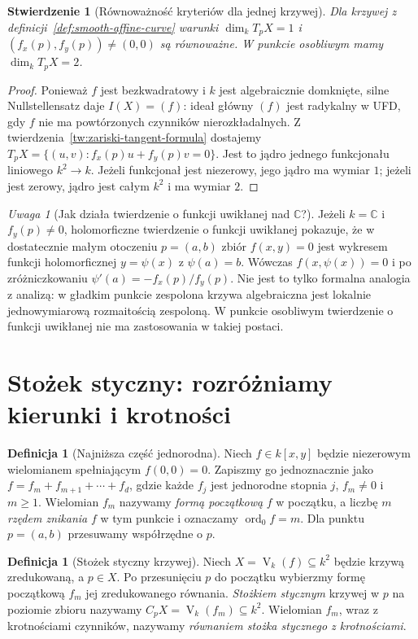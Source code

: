 \documentclass[11pt,a4paper,openany]{report}
\numberwithin{equation}{section}
\theoremstyle{plain}
\newtheorem{stwierdzenie}[twierdzenie]{Stwierdzenie}
\theoremstyle{definition}
\newtheorem{definicja}[twierdzenie]{Definicja}
\theoremstyle{remark}
\newtheorem{uwaga}[twierdzenie]{Uwaga}
\newcommand{\C}{\mathbb C}
\newcommand{\V}{\operatorname V}
\begin{document}
\begin{stwierdzenie}[Równoważność kryteriów dla jednej krzywej]
Dla krzywej z definicji~\ref{def:smooth-affine-curve}
warunki $\dim_k T_pX=1$ i
$(f_x(p),f_y(p))\ne(0,0)$ są równoważne.
W punkcie osobliwym mamy $\dim_kT_pX=2$.
\end{stwierdzenie}
\begin{proof}
Ponieważ $f$ jest bezkwadratowy i $k$ jest algebraicznie
domknięte, silne Nullstellensatz daje $I(X)=(f)$:
ideał główny $(f)$ jest radykalny w UFD, gdy $f$ nie ma
powtórzonych czynników nierozkładalnych.
Z twierdzenia~\ref{tw:zariski-tangent-formula} dostajemy
$T_pX=\{(u,v):f_x(p)u+f_y(p)v=0\}$.
Jest to jądro jednego funkcjonału liniowego $k^2\to k$.
Jeżeli funkcjonał jest niezerowy, jego jądro ma wymiar $1$;
jeżeli jest zerowy, jądro jest całym $k^2$ i ma wymiar $2$.
\end{proof}

\begin{uwaga}[Jak działa twierdzenie o funkcji uwikłanej nad $\C$?]
Jeżeli $k=\C$ i $f_y(p)\ne0$, holomorficzne twierdzenie
o funkcji uwikłanej pokazuje, że w dostatecznie małym
otoczeniu $p=(a,b)$ zbiór $f(x,y)=0$ jest wykresem
funkcji holomorficznej $y=\psi(x)$ z $\psi(a)=b$.
Wówczas $f(x,\psi(x))=0$ i po zróżniczkowaniu
$\psi'(a)=-f_x(p)/f_y(p)$. Nie jest to tylko formalna
analogia z analizą: w gładkim punkcie zespolona krzywa
algebraiczna jest lokalnie jednowymiarową rozmaitością
zespoloną. W punkcie osobliwym twierdzenie o funkcji
uwikłanej nie ma zastosowania w takiej postaci.
\end{uwaga}

\section{Stożek styczny: rozróżniamy kierunki i krotności}

\begin{definicja}[Najniższa część jednorodna]
Niech $f\in k[x,y]$ będzie niezerowym wielomianem
spełniającym $f(0,0)=0$. Zapiszmy go jednoznacznie jako
$f=f_m+f_{m+1}+\cdots+f_d$, gdzie każde $f_j$
jest jednorodne stopnia $j$, $f_m\ne0$ i $m\ge1$.
Wielomian $f_m$ nazywamy \emph{formą początkową} $f$
w początku, a liczbę $m$ \emph{rzędem znikania} $f$
w tym punkcie i oznaczamy $\operatorname{ord}_0f=m$.
Dla punktu $p=(a,b)$ przesuwamy współrzędne o $p$.
\end{definicja}

\begin{definicja}[Stożek styczny krzywej]
Niech $X=\V_k(f)\subseteq k^2$ będzie krzywą zredukowaną,
a $p\in X$. Po przesunięciu $p$ do początku wybierzmy
formę początkową $f_m$ jej zredukowanego równania.
\emph{Stożkiem stycznym} krzywej w $p$ na poziomie zbioru
nazywamy $C_pX=\V_k(f_m)\subseteq k^2$.
Wielomian $f_m$, wraz z krotnościami czynników,
nazywamy \emph{równaniem stożka stycznego z krotnościami}.
\end{definicja}
\end{document}
